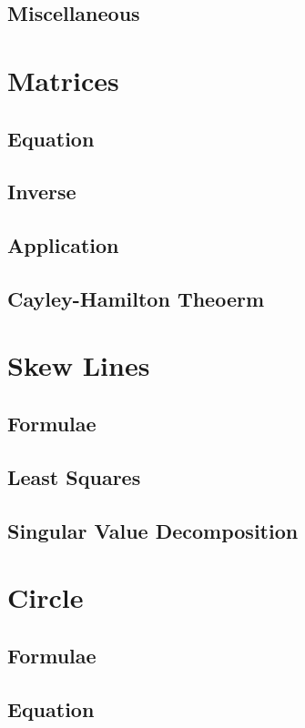 \documentclass[journal]{IEEEtran}
\begin{document}
\subsection{Miscellaneous }

\newpage
\section{Matrices}
\subsection{Equation}

\subsection{Inverse}

\subsection{Application}

\subsection{Cayley-Hamilton Theoerm}

\newpage
\section{Skew Lines}
\subsection{Formulae}

\subsection{Least Squares}

\subsection{Singular Value Decomposition}

\newpage
\section{Circle}
\subsection{Formulae}

\subsection{Equation}

\end{document}
